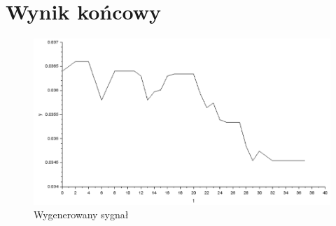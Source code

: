 \documentclass[12pt]{mwart}
\begin{document}
	
	
	\section{Wynik końcowy}
	
	\begin{figure}[H]
	\begin{center}
		\includegraphics[width=\linewidth]{wygenerowany sygnal.png}
		\caption{Wygenerowany sygnał}
	\end{center}
	\end{figure}
	
	
\end{document}
